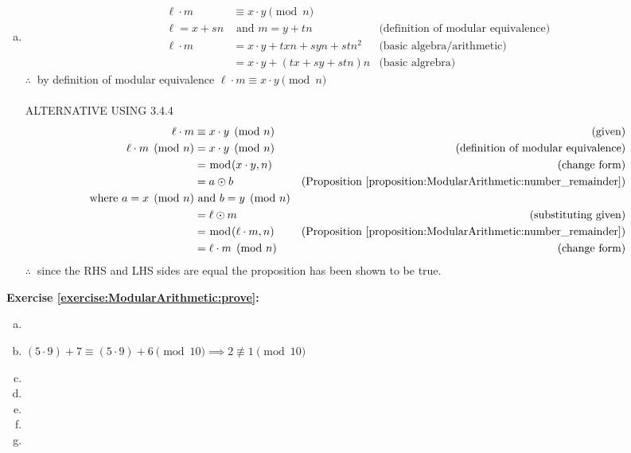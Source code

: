 \begin{enumerate}[(a)]
\item 
\begin{align*}
\ell \cdot m &\equiv x \cdot y \pmod{n}\\
\ell = x + sn &\text{\ and\ } m = y + tn  &\text{(definition of modular equivalence)}\\
\ell \cdot m &= x\cdot y + txn + syn + stn^{2} &\text{(basic algebra/arithmetic)}\\
&=x\cdot y + (tx+sy+stn)n &\text{(basic algrebra)}
\end{align*}
$\therefore\ $ by definition of modular equivalence $\ell\cdot m \equiv x\cdot y \pmod{n}$\\
\\
ALTERNATIVE USING 3.4.4
\begin{align*} 
\ell \cdot m &\equiv x \cdot y\pmod{n} &\text{(given)}\\
\ell \cdot m \pmod{n} &= x \cdot y\pmod{n}  &\text{(definition of modular equivalence)}\\
&= \bmod(x \cdot y, n)  &\text{(change form)}\\
&= a \odot b &\text{(Proposition~\ref{proposition:ModularArithmetic:number_remainder})}\\
\text{where\ } a = x\pmod{n} &\text{\ and\ } b = y\pmod{n}\\
&= \ell \odot m &\text{(substituting given)}\\
&= \bmod(\ell \cdot m, n) &\text{(Proposition~\ref{proposition:ModularArithmetic:number_remainder})}\\
&= \ell \cdot m\pmod{n} &\text{(change form)}
\end{align*}
$\therefore\ $ since the RHS and LHS sides are equal the proposition has been shown to be true.
\end{enumerate}

\noindent\textbf{Exercise \ref{exercise:ModularArithmetic:prove}:} 
\begin{enumerate}[(a)]
\item
\item
$(5 \cdot 9)+7 \equiv (5 \cdot 9)+6 \pmod{10} \implies 2 \not\equiv 1 \pmod{10}$

\item
\item
\item
\item
\item
\end{enumerate}

